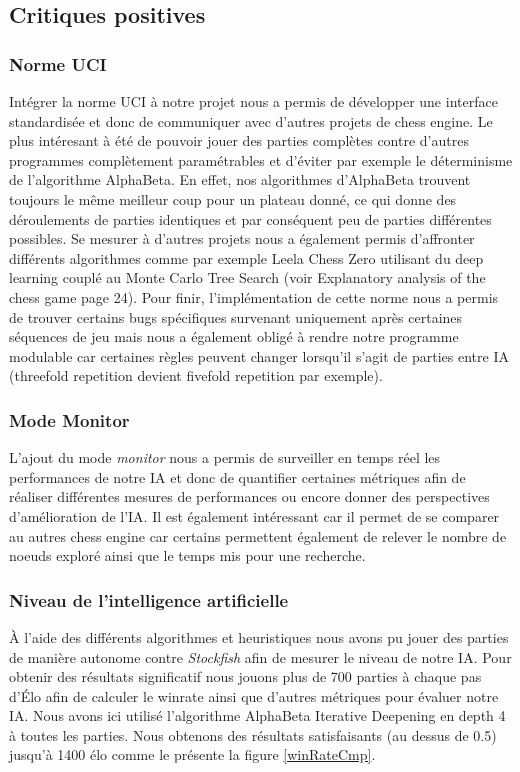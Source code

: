 \documentclass{article}
\begin{document}
\subsection{Critiques positives}
\subsubsection{Norme UCI}
Intégrer la norme UCI à notre projet nous a permis de développer une interface standardisée et donc de communiquer avec d'autres projets de chess engine.
Le plus intéresant à été de pouvoir jouer des parties complètes contre d'autres programmes complètement paramétrables et d'éviter par exemple le déterminisme
de l'algorithme AlphaBeta. En effet, nos algorithmes d'AlphaBeta trouvent toujours le même meilleur coup pour un plateau donné, ce qui donne des déroulements de parties
identiques et par conséquent peu de parties différentes possibles. Se mesurer à d'autres projets nous a également permis d'affronter différents algorithmes comme par exemple
Leela Chess Zero utilisant du deep learning couplé au Monte Carlo Tree Search (voir Explanatory analysis of the chess game \cite{GameEngine} page 24).
Pour finir, l'implémentation de cette norme nous a permis de trouver certains bugs spécifiques survenant uniquement après certaines séquences de jeu mais nous a également
obligé à rendre notre programme modulable car certaines règles peuvent changer lorsqu'il s'agit de parties entre IA (threefold repetition devient fivefold repetition par exemple).
\subsubsection{Mode Monitor}
L'ajout du mode \textit{monitor} nous a permis de surveiller en temps réel les performances de notre IA et donc de quantifier certaines métriques afin de réaliser différentes mesures de
performances ou encore donner des perspectives d'amélioration de l'IA. Il est également intéressant car il permet de se comparer au autres chess engine car certains permettent également 
de relever le nombre de noeuds exploré ainsi que le temps mis pour une recherche.

\subsubsection{Niveau de l'intelligence artificielle}
À l'aide des différents algorithmes et heuristiques nous avons pu jouer des parties de manière autonome contre \textit{Stockfish} afin de mesurer le niveau de notre IA.
Pour obtenir des résultats significatif nous jouons plus de 700 parties à chaque pas d'Élo afin de calculer le winrate ainsi que d'autres métriques pour évaluer notre IA.
Nous avons ici utilisé l'algorithme AlphaBeta Iterative Deepening en depth 4 à toutes les parties. Nous obtenons des résultats satisfaisants (au dessus de 0.5) jusqu’à 1400 élo comme le présente la figure \ref{winRateCmp}.
\end{document}
